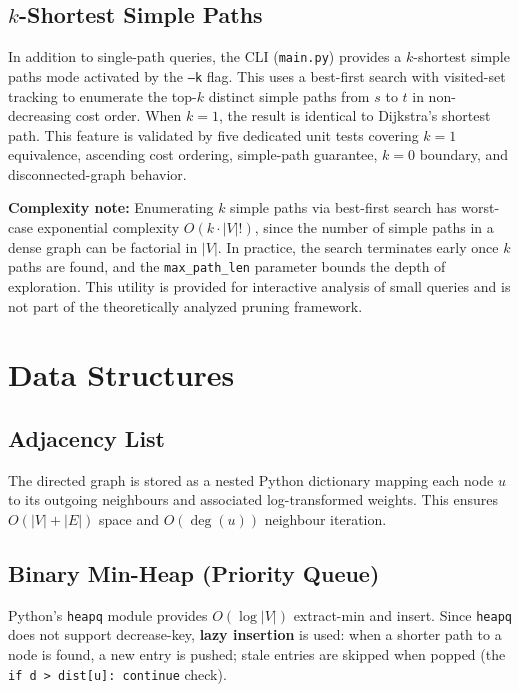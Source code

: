 \subsection{\texorpdfstring{$k$}{k}-Shortest Simple Paths}

In addition to single-path queries, the CLI (\texttt{main.py}) provides a $k$-shortest simple paths mode activated by the \texttt{--k} flag. This uses a best-first search with visited-set tracking to enumerate the top-$k$ distinct simple paths from $s$ to $t$ in non-decreasing cost order. When $k=1$, the result is identical to Dijkstra's shortest path. This feature is validated by five dedicated unit tests covering $k=1$ equivalence, ascending cost ordering, simple-path guarantee, $k=0$ boundary, and disconnected-graph behavior.

\textbf{Complexity note:} Enumerating $k$ simple paths via best-first search has worst-case exponential complexity $O(k \cdot |V|!)$, since the number of simple paths in a dense graph can be factorial in $|V|$. In practice, the search terminates early once $k$ paths are found, and the \texttt{max\_path\_len} parameter bounds the depth of exploration. This utility is provided for interactive analysis of small queries and is not part of the theoretically analyzed pruning framework.

\section{Data Structures}

\subsection{Adjacency List}

The directed graph is stored as a nested Python dictionary mapping each node $u$ to its outgoing neighbours and associated log-transformed weights. This ensures $O(|V|+|E|)$ space and $O(\deg(u))$ neighbour iteration.

\subsection{Binary Min-Heap (Priority Queue)}

Python's \texttt{heapq} module provides $O(\log|V|)$ extract-min and insert. Since \texttt{heapq} does not support decrease-key, \textbf{lazy insertion} is used: when a shorter path to a node is found, a new entry is pushed; stale entries are skipped when popped (the \texttt{if d > dist[u]: continue} check).

